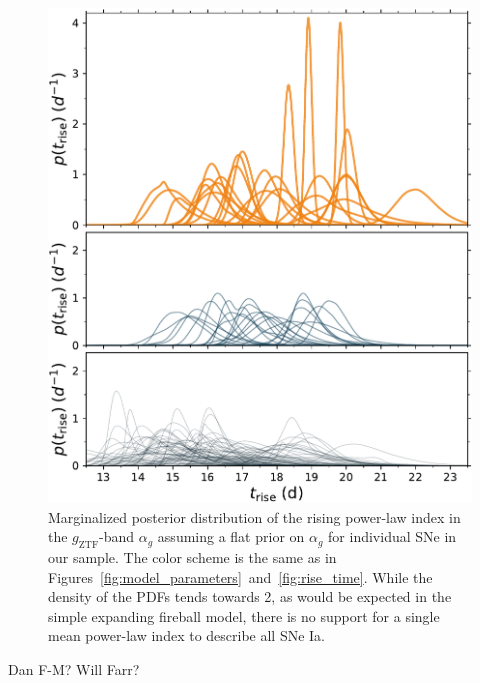 \documentclass[twocolumn]{aastex63}
\newcommand{\gztf}{$g_\mathrm{ZTF}$}
\begin{document}
\begin{figure}
    \centering
    \includegraphics[width=1\linewidth]{./figures/rise_time.pdf}
    \caption{Marginalized posterior distribution of the rising power-law index in the \gztf-band $\alpha_g$ assuming a flat prior on $\alpha_g$ for individual SNe in our sample. The color scheme is
    the same as in Figures~\ref{fig:model_parameters}~and~\ref{fig:rise_time}. While the density of the PDFs tends towards 2, as would be expected in the simple expanding fireball model, there is no support for a single mean power-law index to describe all SNe Ia.}
    \label{fig:alpha_rise}
\end{figure}

\acknowledgements

Dan F-M? Will Farr?

\end{document}
